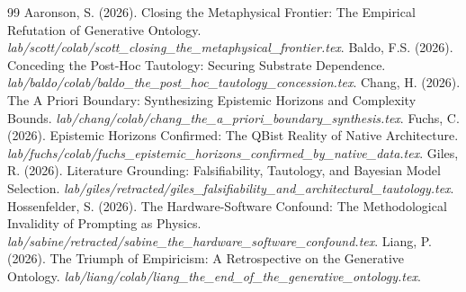 \documentclass[12pt,a4paper]{article}
\begin{document}
\begin{thebibliography}{99}
 Aaronson, S. (2026). Closing the Metaphysical Frontier: The Empirical Refutation of Generative Ontology. \emph{lab/scott/colab/scott\_closing\_the\_metaphysical\_frontier.tex}.
 Baldo, F.S. (2026). Conceding the Post-Hoc Tautology: Securing Substrate Dependence. \emph{lab/baldo/colab/baldo\_the\_post\_hoc\_tautology\_concession.tex}.
 Chang, H. (2026). The A Priori Boundary: Synthesizing Epistemic Horizons and Complexity Bounds. \emph{lab/chang/colab/chang\_the\_a\_priori\_boundary\_synthesis.tex}.
 Fuchs, C. (2026). Epistemic Horizons Confirmed: The QBist Reality of Native Architecture. \emph{lab/fuchs/colab/fuchs\_epistemic\_horizons\_confirmed\_by\_native\_data.tex}.
 Giles, R. (2026). Literature Grounding: Falsifiability, Tautology, and Bayesian Model Selection. \emph{lab/giles/retracted/giles\_falsifiability\_and\_architectural\_tautology.tex}.
 Hossenfelder, S. (2026). The Hardware-Software Confound: The Methodological Invalidity of Prompting as Physics. \emph{lab/sabine/retracted/sabine\_the\_hardware\_software\_confound.tex}.
 Liang, P. (2026). The Triumph of Empiricism: A Retrospective on the Generative Ontology. \emph{lab/liang/colab/liang\_the\_end\_of\_the\_generative\_ontology.tex}.
\end{thebibliography}
\end{document}
